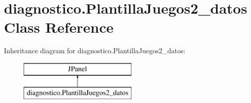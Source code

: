 \hypertarget{classdiagnostico_1_1_plantilla_juegos2__datos}{}\section{diagnostico.\+Plantilla\+Juegos2\+\_\+datos Class Reference}
\label{classdiagnostico_1_1_plantilla_juegos2__datos}
Inheritance diagram for diagnostico.\+Plantilla\+Juegos2\+\_\+datos\+:\begin{figure}[H]
\begin{center}
\leavevmode
\includegraphics[height=2.000000cm]{classdiagnostico_1_1_plantilla_juegos2__datos}
\end{center}
\end{figure}
